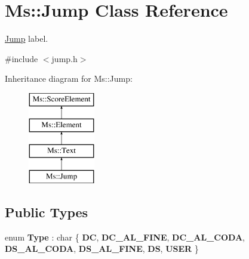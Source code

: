 \hypertarget{class_ms_1_1_jump}{}\section{Ms\+:\+:Jump Class Reference}
\label{class_ms_1_1_jump}


\hyperlink{class_ms_1_1_jump}{Jump} label.  




{\ttfamily \#include $<$jump.\+h$>$}

Inheritance diagram for Ms\+:\+:Jump\+:\begin{figure}[H]
\begin{center}
\leavevmode
\includegraphics[height=4.000000cm]{class_ms_1_1_jump}
\end{center}
\end{figure}
\subsection*{Public Types}
\begin{DoxyCompactItemize}
\item 
\mbox{\label{class_ms_1_1_jump_a5b408fc690d66a0474ba7c9a9c51420f}} 
enum {\bfseries Type} \+: char \{ \newline
{\bfseries DC}, 
{\bfseries D\+C\+\_\+\+A\+L\+\_\+\+F\+I\+NE}, 
{\bfseries D\+C\+\_\+\+A\+L\+\_\+\+C\+O\+DA}, 
{\bfseries D\+S\+\_\+\+A\+L\+\_\+\+C\+O\+DA}, 
\newline
{\bfseries D\+S\+\_\+\+A\+L\+\_\+\+F\+I\+NE}, 
{\bfseries DS}, 
{\bfseries U\+S\+ER}
 \}
\end{DoxyCompactItemize}
